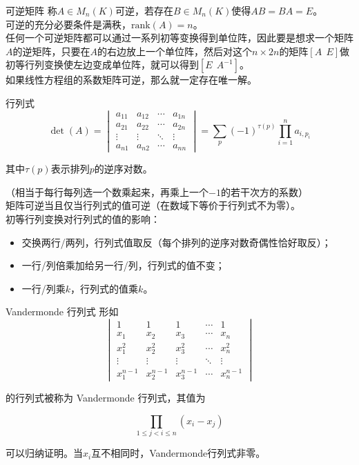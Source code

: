 \documentclass{beamer}
\begin{document}
\begin{frame}{可逆矩阵}
	称$A \in M_n(K)$可逆，若存在$B \in M_n(K)$使得$AB = BA = E$。\\
	
	可逆的充分必要条件是满秩，$\mathrm{rank}(A) = n$。\\
	
	任何一个可逆矩阵都可以通过一系列初等变换得到单位阵，因此要是想求一个矩阵$A$的逆矩阵，只要在$A$的右边放上一个单位阵，然后对这个$n \times 2n$的矩阵$[A \ \ E]$做初等行列变换使左边变成单位阵，就可以得到$[E \ \ A^{-1}]$。\\
	
	如果线性方程组的系数矩阵可逆，那么就一定存在唯一解。
\end{frame}

\begin{frame}{行列式}
	$$\det(A) = \begin{vmatrix}
		a_{11} & a_{12} & \cdots & a_{1n}\\
		a_{21} & a_{22} & \cdots & a_{2n}\\
		\vdots & \vdots & \ddots & \vdots\\
		a_{n1} & a_{n2} & \cdots & a_{nn}
	\end{vmatrix} = \sum_p(-1)^{\tau(p)}\prod_{i=1}^na_{i, p_i}$$

	其中$\tau(p)$表示排列$p$的逆序对数。
	
	（相当于每行每列选一个数乘起来，再乘上一个$-1$的若干次方的系数）\\
	
	矩阵可逆当且仅当行列式的值可逆（在数域下等价于行列式不为零）。\\
	
	初等行列变换对行列式的值的影响：
	\begin{itemize}
		\item 交换两行/两列，行列式值取反（每个排列的逆序对数奇偶性恰好取反）；
		\item 一行/列倍乘加给另一行/列，行列式的值不变；
		\item 一行/列乘$k$，行列式的值乘$k$。
	\end{itemize}
\end{frame}

\begin{frame}{Vandermonde 行列式}
	形如$$\begin{vmatrix}
		1 & 1 & 1 & \cdots & 1\\
		x_1 & x_2 & x_3 & \cdots & x_n\\
		x_1^2 & x_2^2 & x_3^2  & \cdots & x_n^2\\
		\vdots & \vdots & \vdots & \ddots & \vdots\\
		x_1^{n-1} & x_2^{n-1} & x_3^{n-1} & \cdots & x_n^{n-1}
	\end{vmatrix}$$
	
	的行列式被称为 Vandermonde 行列式，其值为
	
	$$\prod_{1 \le j < i \le n}(x_i - x_j)$$
	
	可以归纳证明。当$x_i$互不相同时，Vandermonde行列式非零。
\end{frame}
\end{document}
